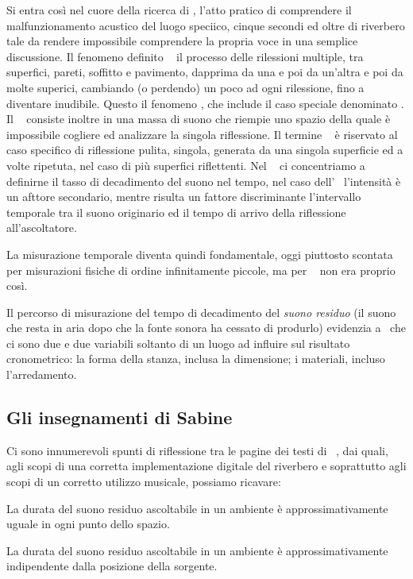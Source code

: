 \begin{refsection}
Si entra così nel cuore della ricerca di \ws, l'atto pratico di comprendere il
malfunzionamento acustico del luogo speciico, cinque secondi ed oltre di riverbero
tale da rendere impossibile comprendere la propria voce in una semplice discussione.
Il fenomeno definito \rev~ il processo delle rilessioni multiple,
tra superfici, pareti, soffitto e pavimento, dapprima da una e poi da un'altra e
poi da molte superici, cambiando (o perdendo) un poco ad ogni rilessione, fino
a diventare inudibile. Questo il fenomeno \rev, che include il caso
speciale denominato \eco. Il \rev~ consiste inoltre in una massa
di suono che riempie uno spazio della quale è impossibile cogliere ed analizzare
la singola riflessione. Il termine \eco~ è riservato al caso specifico di
riflessione pulita, singola, generata da una singola superficie ed a volte ripetuta,
nel caso di più superfici riflettenti. Nel \rev~ ci concentriamo a definirne il
tasso di decadimento del suono nel tempo, nel caso dell'\eco~ l'intensità è un
afttore secondario, mentre risulta un fattore discriminante l'intervallo temporale
tra il suono originario ed il tempo di arrivo della riflessione all'ascoltatore.

La misurazione temporale diventa quindi fondamentale, oggi piuttosto scontata
per misurazioni fisiche di ordine infinitamente piccole, ma per \ws~ non era proprio
così.

Il percorso di misurazione del tempo di decadimento del \emph{suono residuo} (il
suono che resta in aria dopo che la fonte sonora ha cessato di produrlo) evidenzia
a \ws~che ci sono due e due variabili soltanto di un luogo  ad influire sul
risultato cronometrico: la forma della stanza, inclusa la dimensione; i materiali,
incluso l'arredamento.

\subsection{Gli insegnamenti di Sabine}

Ci sono innumerevoli spunti di riflessione tra le pagine dei testi di \ws~\cite{ws:rev},
dai quali, agli scopi di una corretta implementazione digitale del riverbero e
soprattutto agli scopi di un corretto utilizzo musicale, possiamo ricavare:

\begin{compactitem}
  \item La durata del suono residuo ascoltabile in un ambiente è approssimativamente
  uguale in ogni punto dello spazio.
  \item La durata del suono residuo ascoltabile in un ambiente è approssimativamente
  indipendente dalla posizione della sorgente.
\end{compactitem}


\end{refsection}
